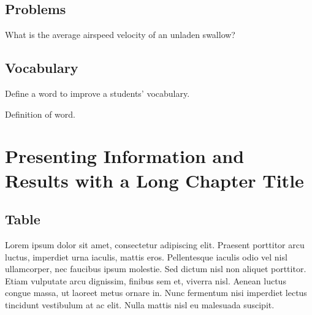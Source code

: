 \documentclass[
	11pt, %
	fleqn, %
	a4paper, %
	oneside, %
]{LegrandOrangeBook}
\begin{document}
\section{Problems}

\begin{problem} %
	What is the average airspeed velocity of an unladen swallow?
\end{problem}


\section{Vocabulary}

Define a word to improve a students' vocabulary.

\begin{vocabulary}[Word] %
	Definition of word.
\end{vocabulary}


\chapterspaceabove{6.25cm} %
\chapterspacebelow{7.5cm} %


\chapter{Presenting Information and Results with a Long Chapter Title}

\section{Table}

Lorem ipsum dolor sit amet, consectetur adipiscing elit. Praesent porttitor arcu luctus, imperdiet urna iaculis, mattis eros. Pellentesque iaculis odio vel nisl ullamcorper, nec faucibus ipsum molestie. Sed dictum nisl non aliquet porttitor. Etiam vulputate arcu dignissim, finibus sem et, viverra nisl. Aenean luctus congue massa, ut laoreet metus ornare in. Nunc fermentum nisi imperdiet lectus tincidunt vestibulum at ac elit. Nulla mattis nisl eu malesuada suscipit.
\end{document}
